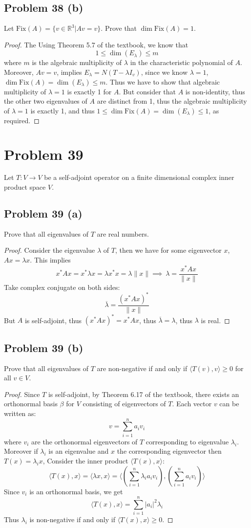 \documentclass{article}[10pt]
\def\RR{\mathbb R}
\begin{document}
\subsection{Problem 38 (b)}Let $\textrm{Fix}(A)=\{v \in \RR^3|Av=v\}$. Prove
that $\dim\textrm{Fix}(A) = 1$.
\begin{proof}
The 
Using Theorem 5.7 of the textbook, we know that
\[
1 \le \dim(E_{\lambda}) \le m
\]
where $m$ is the algebraic multiplicity of $\lambda$ in the characteristic
polynomial of $A$. Moreover, $Av=v$, implies 
$E_{\lambda}=N(T-\lambda I_v)$, since we know
$\lambda=1$, $\dim\textrm{Fix}(A)=\dim(E_{\lambda})\le m$. Thus we have to
show that algebraic multiplicity of $\lambda=1$ is exactly 1 for $A$. But
consider that $A$ is non-identity, thus the other two eigenvalues of $A$
are distinct from 1, thus the algebraic multiplicity of $\lambda=1$ is exactly
1, and thus $1\le\dim\textrm{Fix}(A)=\dim(E_{\lambda})\le 1$, as required.
\end{proof}
\section{Problem 39} Let $T:V\to V$ be a self-adjoint operator on a finite
dimensional complex inner product space $V$.
\subsection{Problem 39 (a)} Prove that all eigenvalues of $T$ are
real numbers.
\begin{proof}
Consider the eigenvalue $\lambda$ of $T$, then we have for some eigenvector
$x$, $Ax=\lambda x$. This implies
\[
x^*Ax = x^*\lambda x = \lambda x^*x = \lambda \|x\| \implies\ 
\lambda = \frac{x^*Ax}{\|x\|}
\]
Take complex conjugate on both sides:
\[
\overline{\lambda} = \frac{(x^*Ax)^*}{\|x\|}
\]
But $A$ is self-adjoint, thus $(x^*Ax)^*=x^*Ax$, thus 
$\overline{\lambda}=\lambda$, thus $\lambda$ is real.
\end{proof}
\subsection{Problem 39 (b)}
Prove that all eigenvalues of $T$ are non-negative if and only if
$\langle T(v),v\rangle\ge 0$ for all $v\in V$.
\begin{proof}
Since $T$ is self-adjoint, by Theorem 6.17 of the textbook, there
exists an orthonormal basis $\beta$ for $V$ consisting of eigenvectors
of $T$.
Each vector $v$ can be written as:
\[
v=\sum_{i=1}^n a_iv_i
\]
where $v_i$ are the orthonormal eigenvectors of $T$ corresponding
to eigenvalue $\lambda_i$.
Moreover if $\lambda_i$ is an eigenvalue and $x$ the corresponding
eigenvector then $T(x)=\lambda_i x$,
Consider the inner product $\langle T(x),x\rangle$:
\[
\langle T(x),x\rangle = \langle \lambda x, x\rangle = 
\langle (\sum_{i=1}^n\lambda_i a_iv_i),(\sum_{i=1}^n a_iv_i) \rangle
\]
Since $v_i$ is an orthonormal basis, we get
\[
\langle T(x),x\rangle = \sum_{i=1}^n |a_i|^2 \lambda_i
\]
Thus $\lambda_i$ is non-negative if and only if $\langle T(x),x\rangle \ge 0$.
\end{proof}
\end{document}
